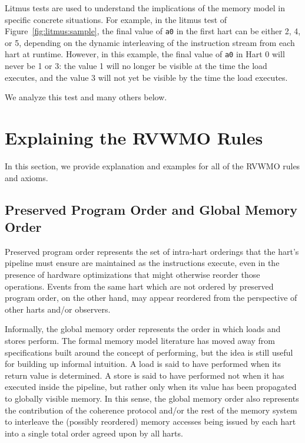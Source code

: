 Litmus tests are used to understand the implications of the memory model in specific concrete situations.
For example, in the litmus test of Figure~\ref{fig:litmus:sample}, the final value of {\tt a0} in the first hart can be either 2, 4, or 5, depending on the dynamic interleaving of the instruction stream from each hart at runtime.
However, in this example, the final value of {\tt a0} in Hart 0 will never be 1 or 3: the value 1 will no longer be visible at the time the load executes, and the value 3 will not yet be visible by the time the load executes.

We analyze this test and many others below.

\section{Explaining the RVWMO Rules}
In this section, we provide explanation and examples for all of the RVWMO rules and axioms.

\subsection{Preserved Program Order and Global Memory Order}
Preserved program order represents the set of intra-hart orderings that the hart's pipeline must ensure are maintained as the instructions execute, even in the presence of hardware optimizations that might otherwise reorder those operations.
Events from the same hart which are not ordered by preserved program order, on the other hand, may appear reordered from the perspective of other harts and/or observers.

Informally, the global memory order represents the order in which loads and stores perform.
The formal memory model literature has moved away from specifications built around the concept of performing, but the idea is still useful for building up informal intuition.
A load is said to have performed when its return value is determined.
A store is said to have performed not when it has executed inside the pipeline, but rather only when its value has been propagated to globally visible memory.
In this sense, the global memory order also represents the contribution of the coherence protocol and/or the rest of the memory system to interleave the (possibly reordered) memory accesses being issued by each hart into a single total order agreed upon by all harts.

